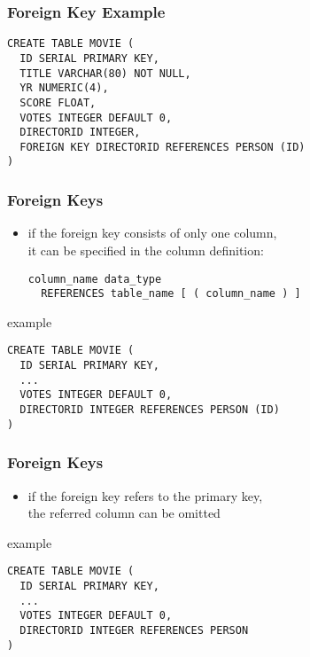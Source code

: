 \documentclass[dvipsnames]{beamer}
\theoremstyle{plain}
\begin{document}
\begin{frame}[fragile]
  \frametitle{Foreign Key Example}

  \begin{lstlisting}
CREATE TABLE MOVIE (
  ID SERIAL PRIMARY KEY,
  TITLE VARCHAR(80) NOT NULL,
  YR NUMERIC(4),
  SCORE FLOAT,
  VOTES INTEGER DEFAULT 0,
  DIRECTORID INTEGER,
  FOREIGN KEY DIRECTORID REFERENCES PERSON (ID)
)
  \end{lstlisting}
\end{frame}

\begin{frame}[fragile]
  \frametitle{Foreign Keys}

  \begin{itemize}
    \item if the foreign key consists of only one column,\\
      it can be specified in the column definition:
    \begin{lstlisting}
column_name data_type
  REFERENCES table_name [ ( column_name ) ]
    \end{lstlisting}
  \end{itemize}

  \begin{exampleblock}{example}
    \begin{lstlisting}
CREATE TABLE MOVIE (
  ID SERIAL PRIMARY KEY,
  ...
  VOTES INTEGER DEFAULT 0,
  DIRECTORID INTEGER REFERENCES PERSON (ID)
)
    \end{lstlisting}
  \end{exampleblock}
\end{frame}

\begin{frame}[fragile]
  \frametitle{Foreign Keys}

  \begin{itemize}
    \item if the foreign key refers to the primary key,\\
      the referred column can be omitted
  \end{itemize}

  \begin{exampleblock}{example}
    \begin{lstlisting}
CREATE TABLE MOVIE (
  ID SERIAL PRIMARY KEY,
  ...
  VOTES INTEGER DEFAULT 0,
  DIRECTORID INTEGER REFERENCES PERSON
)
    \end{lstlisting}
  \end{exampleblock}
\end{frame}
\end{document}
